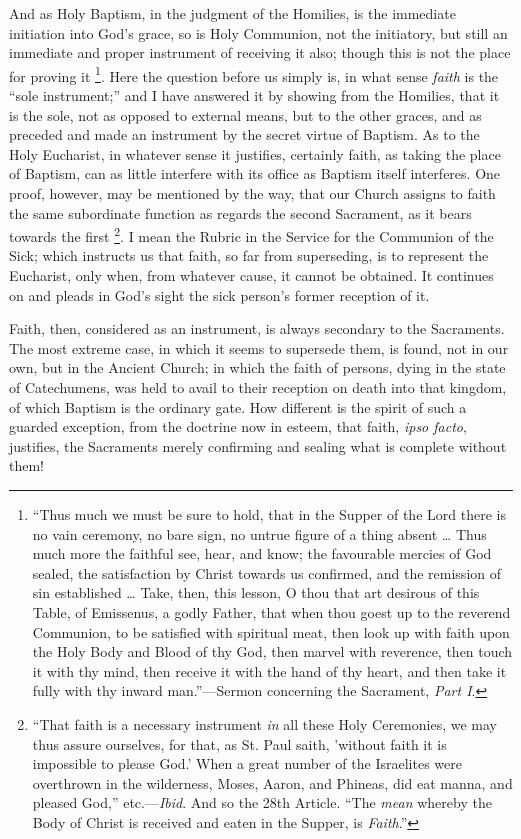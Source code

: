 And as Holy Baptism, in the judgment of the Homilies, is the
immediate initiation into God's grace, so is Holy Communion, not the
initiatory, but still an immediate and proper instrument of receiving
it also; though this is not the place for proving it \footnote{``Thus much
we must be sure to hold, that in the Supper of the Lord there is no
vain ceremony, no bare sign, no untrue figure of a thing absent …
Thus much more the faithful see, hear, and know; the favourable
mercies of God sealed, the satisfaction by Christ towards us
confirmed, and the remission of sin established … Take, then, this
lesson, O thou that art desirous of this Table, of Emissenus, a godly
Father, that when thou goest up to the reverend Communion, to be
satisfied with spiritual meat, then look up with faith upon the Holy
Body and Blood of thy God, then marvel with reverence, then touch it
with thy mind, then receive it with the hand of thy heart, and then
take it fully with thy inward man.''—Sermon concerning the
Sacrament, \emph{Part I}.}. Here the question before us simply is, in what sense \emph{faith}
is the ``sole instrument;'' and I have answered it by showing
from the Homilies, that it is the sole, not as opposed to external
means, but to the other graces, and as preceded and made an instrument
by the secret virtue of Baptism. As to the Holy Eucharist, in whatever
sense it justifies, certainly faith, as taking the place of Baptism,
can as little interfere with its office as Baptism itself interferes.
One proof, however, may be mentioned by the way, that our Church
assigns to faith the same subordinate function as regards the second
Sacrament, as it bears towards the first \footnote{``That
faith is a necessary instrument \emph{in} all these Holy Ceremonies, we may
thus assure ourselves, for that, as St. Paul saith, 'without faith it
is impossible to please God.' When a great number of the Israelites
were overthrown in the wilderness, Moses, Aaron, and Phineas, did eat
manna, and pleased God,'' etc.—\emph{Ibid}. And so the 28th
Article. ``The \emph{mean} whereby the Body of Christ is received
and eaten in the Supper, is \emph{Faith}.''}. I mean the Rubric in the Service for the Communion of the
Sick; which instructs us that faith, so far from superseding, is to
represent the Eucharist, only when, from whatever cause, it
cannot be obtained. It continues on and pleads in God's sight the sick
person's former reception of it.

Faith, then, considered as an instrument, is always secondary to
the Sacraments. The most extreme case, in which it seems to supersede
them, is found, not in our own, but in the Ancient Church; in which
the faith of persons, dying in the state of Catechumens, was held to
avail to their reception on death into that kingdom, of which Baptism
is the ordinary gate. How different is the spirit of such a guarded
exception, from the doctrine now in esteem, that faith, \emph{ipso facto},
justifies, the Sacraments merely confirming and sealing what is
complete without them!

